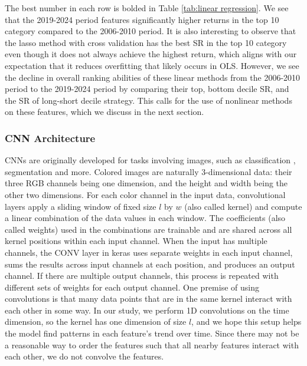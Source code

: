 \documentclass[preprint,12pt,numafflabel,authoryear]{elsarticle}
\begin{document}
The best number in each row is bolded in Table \ref{tab:linear regression}. We see that the 2019-2024 period features significantly higher returns in the top 10 category compared to the 2006-2010 period. It is also interesting to observe that the lasso method with cross validation has the best SR in the top 10 category even though it does not always achieve the highest return, which aligns with our expectation that it reduces overfitting that likely occurs in OLS. However, we see the decline in overall ranking abilities of these linear methods from the 2006-2010 period to the 2019-2024 period by comparing their top, bottom decile SR, and the SR of long-short decile strategy. This calls for the use of nonlinear methods on these features, which we discuss in the next section.

\subsubsection{CNN Architecture}
\label{sec:CNN Architecture}

CNNs are originally developed for tasks involving images, such as classification \citep{lecun1998gradient}, segmentation \citep{ronneberger2015u} and more. Colored images are naturally 3-dimensional data: their three RGB channels being one dimension, and the height and width being the other two dimensions. For each color channel in the input data, convolutional layers apply a sliding window of fixed size $l$ by $w$ (also called kernel) and compute a linear combination of the data values in each window. The coefficients (also called weights) used in the combinations are trainable and are shared across all kernel positions within each input channel. When the input has multiple channels, the CONV layer in keras uses separate weights in each input channel, sums the results across input channels at each position, and produces an output channel. If there are multiple output channels, this process is repeated with different sets of weights for each output channel. One premise of using convolutions is that many data points that are in the same kernel interact with each other in some way. In our study, we perform 1D convolutions on the time dimension, so the kernel has one dimension of size $l$, and we hope this setup helps the model find patterns in each feature's trend over time. Since there may not be a reasonable way to order the features such that all nearby features interact with each other, we do not convolve the features.
\end{document}
